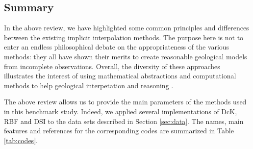 \documentclass[preprint]{ring20}
\begin{document}
{

\subsection{Summary}

In the above review, we have highlighted some common principles and differences between the existing implicit interpolation methods. The purpose here is not to enter an endless philosophical debate on the appropriateness of the various methods: they all have shown their merits to create reasonable geological models from incomplete observations. Overall, the diversity of these approaches illustrates the interest of using mathematical abstractions and computational methods to help geological interpetation and reasoning \citep{frodeman_geological_1995}. %

The above review allows us to provide the main parameters of the methods used in this benchmark study. Indeed, we applied several implementations of DcK, RBF and DSI to the data sets described in Section \ref{sec:data}. The names, main features and references 
for the corresponding codes are summarized in Table \ref{tab:codes}. 

}
\end{document}

